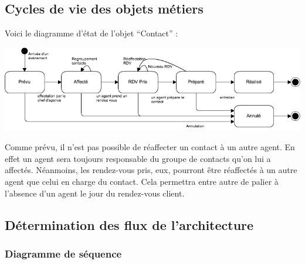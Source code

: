 \subsection{Cycles de vie des objets métiers}

Voici le diagramme d'état de l'objet ``Contact'' :

\begin {center}
\includegraphics[width=\textwidth]{diagramme-etat-objet-contact.png}
\end {center}
Comme prévu, il n'est pas possible de réaffecter un contact à un autre agent. En effet un agent sera toujours responsable du groupe de contacts qu'on lui a affectés. Néanmoins, les rendez-vous pris, eux, pourront être réaffectés à un autre agent que celui en charge du contact. Cela permettra entre autre de palier à l'absence d'un agent le jour du rendez-vous client.


\subsection{Détermination des flux de l'architecture}

\subsubsection{Diagramme de séquence}

